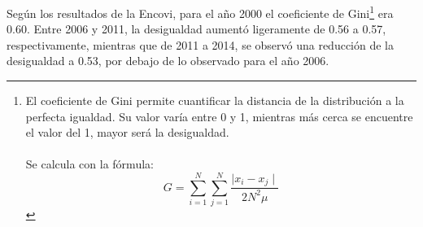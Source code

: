 Según los resultados de la Encovi, para el año 2000 el coeficiente de Gini\footnote{El coeficiente de Gini permite cuantificar la distancia de la distribución a la perfecta igualdad. Su valor varía entre 0 y 1, mientras más cerca se encuentre el valor del 1, mayor será la desigualdad. \\\\ 
	Se calcula con la fórmula: 
	\[ G= \sum_{i=1}^{N}\sum_{j=1}^{N}\frac{\mid x_i - x_j \mid}{2N^2\mu} \]} era 0.60. Entre 2006 y 2011, la desigualdad aumentó ligeramente de 0.56 a 0.57, respectivamente, mientras que de 2011 a 2014, se observó una reducción de la desigualdad a 0.53, por debajo de lo observado para el año 2006.
